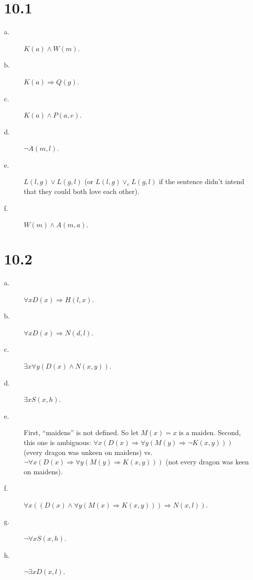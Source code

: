 \documentclass[12pt]{article}
\begin{document}
\section*{10.1}
\begin{description}
\item[a.] $K(a) \wedge W(m)$.
\item[b.] $K(a) \Rightarrow Q(g)$.
\item[c.] $K(a) \wedge P(a,e)$.
\item[d.] $\neg A(m,l)$.
\item[e.] $L(l,g) \vee L(g,l)$ \hspace{2em}  (or $L(l,g) \vee_e L(g,l)$ if the
sentence didn't intend that they could both love each other).
\item[f.] $W(m) \wedge A(m,a)$.
\end{description}

\section*{10.2}
\begin{description}
\item[a.] $\forall x D(x) \Rightarrow H(l,x)$.
\item[b.] $\forall x D(x) \Rightarrow N(d,l)$.
\item[c.] $\exists x \forall y (D(x) \wedge N(x,y))$.
\item[d.] $\exists x S(x,h)$.
\item[e.] First, ``maidens'' is not defined.  So let $M(x) = x\;\text{is
a maiden}$.  Second, this one is ambiguous: $\forall x (D(x) \Rightarrow
\forall y (M(y) \Rightarrow \neg K(x,y)))$ (every dragon was unkeen on
  maidens) vs. $\neg \forall x (D(x) \Rightarrow \forall y (M(y)
  \Rightarrow K(x,y)))$ (not every dragon was keen on maidens).
\item[f.] $\forall x ((D(x) \wedge \forall y (M(x) \Rightarrow K(x,y)))
  \Rightarrow N(x,l))$.
\item[g.] $\neg \forall x S(x,h)$.
\item[h.] $\neg \exists x D(x,l)$.
\end{description}
\end{document}
